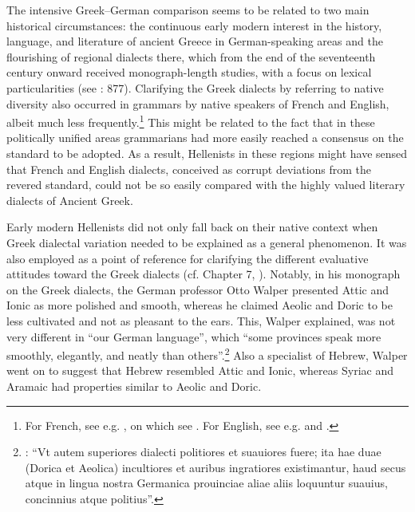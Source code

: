 The intensive Greek–German comparison seems to be related to two main historical circumstances: the continuous early modern interest in the history, language, and literature of ancient Greece in German-speaking areas and the flourishing of regional dialects there, which from the end of the seventeenth century onward received monograph-length studies, with a focus on lexical particularities (see \citealt{Hasler2009}: 877). Clarifying the Greek dialects by referring to native  diversity also occurred in grammars by native speakers of French and English, albeit much less frequently.\footnote{For French, see e.g. \citet[11--12]{Antesignanus1554}, on which see \citet{VanRooy2016c}. For English, see e.g. \citet[191--192]{Milner1734} and \citet[121]{Holmes1735}.} This might be related to the fact that in these politically unified areas grammarians had more easily reached a consensus on the  standard to be adopted. As a result, Hellenists in these regions might have sensed that French and English dialects, conceived as corrupt deviations from the revered standard, could not be so easily compared with the highly valued literary dialects of Ancient Greek.

Early modern Hellenists did not only fall back on their native context when Greek dialectal variation needed to be explained as a general phenomenon. It was also employed as a point of reference for clarifying the different evaluative attitudes toward the Greek dialects (cf. Chapter 7, ). Notably, in his monograph on the Greek dialects, the German professor Otto Walper presented Attic and Ionic as more polished and smooth, whereas he claimed Aeolic and Doric to be less cultivated and not as pleasant to the ears. This, Walper explained, was not very different in “our German language”, which “some provinces speak more smoothly, elegantly, and neatly than others”.\footnote{\citet[61]{Walper1589}: “Vt autem superiores dialecti politiores et suauiores fuere; ita hae duae (Dorica et Aeolica) incultiores et auribus ingratiores existimantur, haud secus atque in lingua nostra Germanica prouinciae aliae aliis loquuntur suauius, concinnius atque politius”.} Also a specialist of Hebrew, Walper went on to suggest that Hebrew resembled Attic and Ionic, whereas Syriac and Aramaic had properties similar to Aeolic and Doric.

